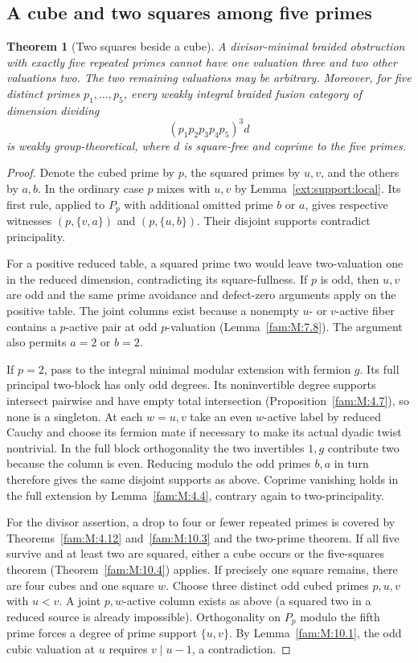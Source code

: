 \documentclass[11pt,a4paper]{article}
\numberwithin{equation}{section}
\newtheorem{theorem}{Theorem}[section]
\theoremstyle{remark}
\begin{document}
\subsection{A cube and two squares among five primes}\label{fam:F:sec:2}
\begin{theorem}[Two squares beside a cube]\label{fam:F:2.1}\label{fam:F:n:f14:five}
A divisor-minimal braided obstruction with exactly five repeated
primes cannot have one valuation three and two other valuations
two. The two remaining valuations may be arbitrary.
Moreover, for five distinct primes $p_1,\ldots,p_5$,
every weakly integral braided fusion category of dimension dividing
\[
                 (p_1p_2p_3p_4p_5)^3d
\]
is weakly group-theoretical, where $d$ is square-free and
coprime to the five primes.
\end{theorem}
\begin{proof}
Denote the cubed prime by $p$, the squared primes by $u,v$, and
the others by $a,b$. In the ordinary case $p$ mixes with $u,v$ by
Lemma~\ref{ext:support:local}. Its first rule, applied to $P_p$
with additional omitted prime $b$ or $a$, gives respective witnesses
$(p,\{v,a\})$ and $(p,\{u,b\})$. Their disjoint supports contradict
principality.

For a positive reduced table, a squared prime two would leave
two-valuation one in the reduced dimension, contradicting its
square-fullness. If $p$ is odd, then $u,v$ are odd and the same
prime avoidance and defect-zero arguments apply on the positive table. The joint columns exist
because a nonempty $u$- or $v$-active fiber contains a $p$-active
pair at odd $p$-valuation (Lemma~\ref{fam:M:7.8}). The argument
also permits $a=2$ or $b=2$.

If $p=2$, pass to the integral minimal modular extension with fermion
$g$. Its full principal two-block has only odd degrees. Its
noninvertible degree supports intersect pairwise and have empty
total intersection (Proposition~\ref{fam:M:4.7}), so none is a
singleton. At each $w=u,v$ take an even $w$-active label by reduced
Cauchy and choose its fermion mate if necessary to make its actual
dyadic twist nontrivial. In the full block orthogonality the
two invertibles $1,g$ contribute two because the column is even.
Reducing modulo the odd primes $b,a$ in turn therefore gives
the same disjoint supports as above. Coprime vanishing holds in
the full extension by Lemma~\ref{fam:M:4.4}, contrary again
to two-principality.

For the divisor assertion, a drop to four or fewer repeated
primes is covered by Theorems~\ref{fam:M:4.12} and~\ref{fam:M:10.3}
and the two-prime theorem. If all five survive and at least two
are squared, either a cube occurs or the five-squares theorem
(Theorem~\ref{fam:M:10.4}) applies. If precisely one square remains, there are four cubes
and one square $w$. Choose three distinct odd cubed primes
$p,u,v$ with $u<v$. A joint $p,w$-active column exists as above
(a squared two in a reduced source is already impossible).
Orthogonality on $P_p$ modulo the fifth prime forces a degree
of prime support $\{u,v\}$. By Lemma~\ref{fam:M:10.1}, the
odd cubic valuation at $u$ requires $v\mid u-1$, a contradiction.


\end{proof}
\end{document}
